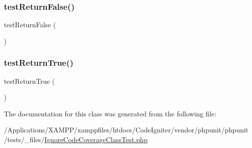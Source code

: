 \subsubsection{\texorpdfstring{test\+Return\+False()}{testReturnFalse()}}
{\footnotesize\ttfamily test\+Return\+False (\begin{DoxyParamCaption}{ }\end{DoxyParamCaption})}

\mbox{\label{class_ignore_code_coverage_class_test_a208671151ff42a6499040887dbd638d5}} 
\subsubsection{\texorpdfstring{test\+Return\+True()}{testReturnTrue()}}
{\footnotesize\ttfamily test\+Return\+True (\begin{DoxyParamCaption}{ }\end{DoxyParamCaption})}



The documentation for this class was generated from the following file\+:\begin{DoxyCompactItemize}
\item 
/\+Applications/\+X\+A\+M\+P\+P/xamppfiles/htdocs/\+Code\+Igniter/vendor/phpunit/phpunit/tests/\+\_\+files/\mbox{\hyperlink{_ignore_code_coverage_class_test_8php}{Ignore\+Code\+Coverage\+Class\+Test.\+php}}\end{DoxyCompactItemize}
